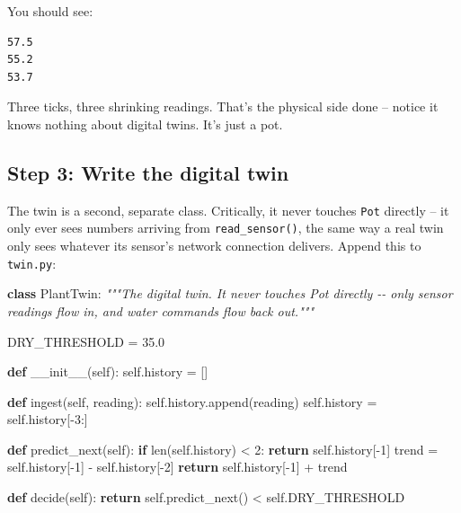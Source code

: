\documentclass[
  12pt,
  a4paper,
]{article}
\newenvironment{Shaded}{}{}
\newcommand{\BuiltInTok}[1]{\textcolor[rgb]{0.00,0.50,0.00}{#1}}
\newcommand{\CommentTok}[1]{\textcolor[rgb]{0.38,0.63,0.69}{\textit{#1}}}
\newcommand{\ControlFlowTok}[1]{\textcolor[rgb]{0.00,0.44,0.13}{\textbf{#1}}}
\newcommand{\DecValTok}[1]{\textcolor[rgb]{0.25,0.63,0.44}{#1}}
\newcommand{\FloatTok}[1]{\textcolor[rgb]{0.25,0.63,0.44}{#1}}
\newcommand{\FunctionTok}[1]{\textcolor[rgb]{0.02,0.16,0.49}{#1}}
\newcommand{\KeywordTok}[1]{\textcolor[rgb]{0.00,0.44,0.13}{\textbf{#1}}}
\newcommand{\NormalTok}[1]{#1}
\newcommand{\OperatorTok}[1]{\textcolor[rgb]{0.40,0.40,0.40}{#1}}
\newcommand{\VariableTok}[1]{\textcolor[rgb]{0.10,0.09,0.49}{#1}}
\begin{document}
You should see:

\begin{verbatim}
57.5
55.2
53.7
\end{verbatim}

Three ticks, three shrinking readings. That's the physical side done --
notice it knows nothing about digital twins. It's just a pot.

\subsection{Step 3: Write the digital
twin}\label{step-3-write-the-digital-twin}

The twin is a second, separate class. Critically, it never touches
\texttt{Pot} directly -- it only ever sees numbers arriving from
\texttt{read\_sensor()}, the same way a real twin only sees whatever its
sensor's network connection delivers. Append this to \texttt{twin.py}:

\begin{Shaded}
\begin{Highlighting}[]


\KeywordTok{class}\NormalTok{ PlantTwin:}
    \CommentTok{"""The digital twin. It never touches Pot directly {-}{-} only sensor}
\CommentTok{    readings flow in, and water commands flow back out."""}

\NormalTok{    DRY\_THRESHOLD }\OperatorTok{=} \FloatTok{35.0}

    \KeywordTok{def} \FunctionTok{\_\_init\_\_}\NormalTok{(}\VariableTok{self}\NormalTok{):}
        \VariableTok{self}\NormalTok{.history }\OperatorTok{=}\NormalTok{ []}

    \KeywordTok{def}\NormalTok{ ingest(}\VariableTok{self}\NormalTok{, reading):}
        \VariableTok{self}\NormalTok{.history.append(reading)}
        \VariableTok{self}\NormalTok{.history }\OperatorTok{=} \VariableTok{self}\NormalTok{.history[}\OperatorTok{{-}}\DecValTok{3}\NormalTok{:]}

    \KeywordTok{def}\NormalTok{ predict\_next(}\VariableTok{self}\NormalTok{):}
        \ControlFlowTok{if} \BuiltInTok{len}\NormalTok{(}\VariableTok{self}\NormalTok{.history) }\OperatorTok{\textless{}} \DecValTok{2}\NormalTok{:}
            \ControlFlowTok{return} \VariableTok{self}\NormalTok{.history[}\OperatorTok{{-}}\DecValTok{1}\NormalTok{]}
\NormalTok{        trend }\OperatorTok{=} \VariableTok{self}\NormalTok{.history[}\OperatorTok{{-}}\DecValTok{1}\NormalTok{] }\OperatorTok{{-}} \VariableTok{self}\NormalTok{.history[}\OperatorTok{{-}}\DecValTok{2}\NormalTok{]}
        \ControlFlowTok{return} \VariableTok{self}\NormalTok{.history[}\OperatorTok{{-}}\DecValTok{1}\NormalTok{] }\OperatorTok{+}\NormalTok{ trend}

    \KeywordTok{def}\NormalTok{ decide(}\VariableTok{self}\NormalTok{):}
        \ControlFlowTok{return} \VariableTok{self}\NormalTok{.predict\_next() }\OperatorTok{\textless{}} \VariableTok{self}\NormalTok{.DRY\_THRESHOLD}
\end{Highlighting}
\end{Shaded}
\end{document}

